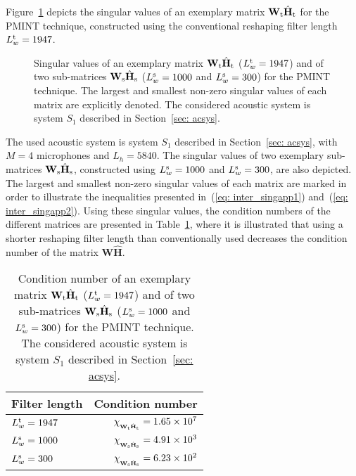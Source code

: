 \documentclass[twocolumn]{bmcart}%
\begin{document}
Figure~\ref{fig: svd} depicts the singular values of an exemplary matrix $\mathbf{W}_{\rm t}\hat{\mathbf{H}}_{\rm t}$ for the PMINT technique, constructed using the conventional reshaping filter length $L^{\rm t}_w = 1947$.
\begin{figure}[t!]
\centering
  

%     
\caption{Singular values of an exemplary matrix $\mathbf{W}_{\rm t}\hat{\mathbf{H}}_{\rm t}$ ($L^{\rm t}_w = 1947$) and of two sub-matrices $\mathbf{W}_{\rm s}\hat{\mathbf{H}}_{\rm s}$ ($L^{\rm s}_w = 1000$ and $L^{\rm s}_w = 300$) for the PMINT technique. The largest and smallest non-zero singular values of each matrix are explicitly denoted. The considered acoustic system is system $S_1$ described in Section~\ref{sec: acsys}.}
\label{fig: svd}
\end{figure}
The used acoustic system is system $S_1$ described in Section~\ref{sec: acsys}, with $M = 4$ microphones and $L_h = 5840$.
The singular values of two exemplary sub-matrices $\mathbf{W}_{\rm s}\hat{\mathbf{H}}_{\rm s}$, constructed using $L^{\rm s}_w = 1000$ and $L^{\rm s}_w = 300$, are also depicted.
The largest and smallest non-zero singular values of each matrix are marked in order to illustrate the inequalities presented in~(\ref{eq: inter_singapp1}) and~(\ref{eq: inter_singapp2}).
Using these singular values, the condition numbers of the different matrices are presented in Table~\ref{tbl: cond_num}, where it is illustrated that using a shorter reshaping filter length than conventionally used decreases the condition number of the matrix $\mathbf{W}\hat{\mathbf{H}}$.
\begin{table}[t!]
\begin{center}
  \caption{Condition number of an exemplary matrix $\mathbf{W}_{\rm t}\hat{\mathbf{H}}_{\rm t}$ ($L^{\rm t}_w = 1947$) and of two sub-matrices $\mathbf{W}_{\rm s}\hat{\mathbf{H}}_{\rm s}$ ($L^{\rm s}_w = 1000$ and $L^{\rm s}_w = 300$) for the PMINT technique. The considered acoustic system is system $S_1$ described in Section~\ref{sec: acsys}.}
  \label{tbl: cond_num}
  \begin{tabularx}{\linewidth}{Xr}
    \toprule
    Filter length & Condition number \\
    \midrule
    $L^{\rm t}_w = 1947$ & $\chi_{_{\mathbf{W}_{\rm t}\hat{\mathbf{H}}_{\rm t}}} = 1.65 \times 10^{7}$ \\
    $L^{\rm s}_w = 1000$ & $\chi_{_{\mathbf{W}_{\rm s}\hat{\mathbf{H}}_{\rm s}}} = 4.91 \times 10^{3}$ \\
    $L^{\rm s}_w = 300$ & $\chi_{_{\mathbf{W}_{\rm s}\hat{\mathbf{H}}_{\rm s}}} = 6.23 \times 10^{2}$ \\
    \bottomrule
  \end{tabularx}
\end{center}
\end{table}
\end{document}
